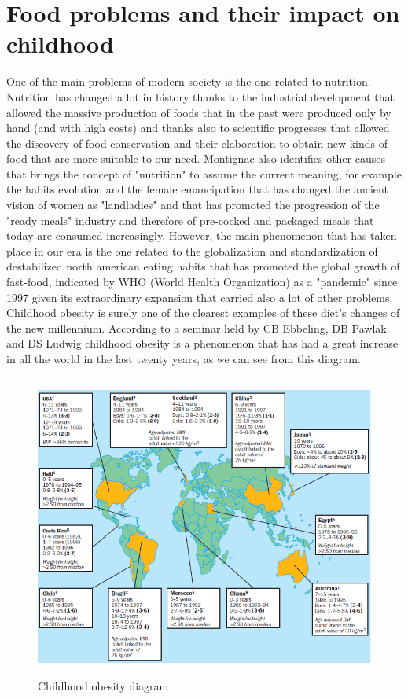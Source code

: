 \section{Food problems and their impact on childhood }
One of the main problems of modern society is the one related to nutrition. Nutrition has changed a lot in history thanks to the industrial development that allowed the massive production of foods that in the past were produced only by hand (and with high costs) and thanks also to scientific progresses that allowed the discovery of food conservation and their elaboration to obtain new kinds of food that are more suitable to our need. Montignac \cite{Lastoriadell'alimentazionedell'uomo.} also identifies other causes that brings the concept of "nutrition" to assume the current meaning, for example the habits evolution and the female emancipation that has changed the ancient vision of women as "landladies" and that has promoted the progression of the "ready meals" industry and therefore of pre-cocked and packaged meals that today are consumed increasingly. However, the main phenomenon that has taken place in our era is the one related to the globalization and standardization of destabilized north american eating habits that has promoted the global growth of fast-food, indicated by WHO (World Health Organization) as a "pandemic" since 1997 given its extraordinary expansion that carried also a lot of other problems.\\
Childhood obesity is surely one of the clearest examples of these diet's changes of the new millennium.
According to a seminar held by CB Ebbeling, DB Pawlak and DS Ludwig \cite{Childhoodobesity} childhood obesity is a phenomenon that has had a great increase in all the world in the last twenty years, as we can see from this diagram.\clearpage
\begin{figure}[H]
\centering
\includegraphics[width=13cm, height=10cm]{immagini/obesity.png}
\caption{Childhood obesity diagram}\label{fig:obesity}
\end{figure}
